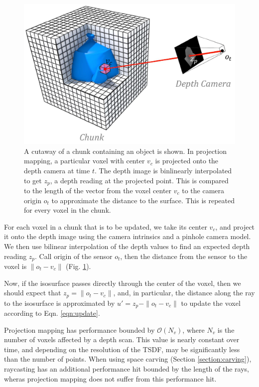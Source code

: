 \documentclass[conference,10pt]{IEEEtran}
\begin{document}
\begin{figure}
  \centering
    \includegraphics[width=0.95\columnwidth]{img/projection_mapping}
      \caption{A cutaway of a chunk containing an object is shown. In projection
      mapping,  a particular voxel with center $v_c$ is projected onto the depth
      camera at time $t$. The depth image is binlinearly interpolated to get
      $z_p$, a depth reading at the projected point. This is compared to the length of the vector
      from the voxel center $v_c$ to the camera origin $o_t$ to approximate the
      distance to the surface. This is repeated for every voxel in the chunk.}
  \label{fig:projection_mapping} 
\end{figure} 


For each voxel in a chunk that is to be updated, we take its center $v_c$, and
project it onto the depth image using the camera intrinsics and a pinhole camera
model. We then use bilinear interpolation of the depth values to find an
expected depth reading $z_p$. Call origin of the sensor  $o_t$,   then the
distance from the sensor to the voxel is $\|o_t - v_c\|$ (Fig. \ref{fig:projection_mapping}).

Now, if the isosurface passes directly through the center of the voxel,
then we should expect that $z_p = \|o_t - v_c\|$, and, in particular, the
distance along the ray to the isosurface is approximated by $u' = z_p - \|o_t -
v_c\|$ to update the voxel according to Eqn. \ref{eqn:update}.

Projection mapping has performance bounded by $\mathcal{O}(N_v)$, where $N_v$ is
the number of voxels affected by a depth scan. This value is nearly constant
over time, and depending on the resolution of the TSDF, may be significantly
less than the number of points. When using space carving (Section
\ref{section:carving}), raycasting has an additional performance hit bounded by
the length of the rays, wheras projection mapping does not suffer from this
performance hit.
\end{document}
